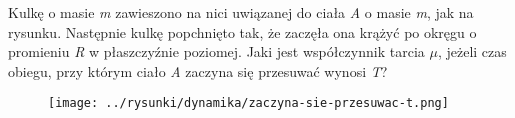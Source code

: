Kulkę o masie \emph{m} zawieszono na nici uwiązanej do ciała \emph{A} o masie \emph{m}, jak na rysunku. Następnie kulkę popchnięto tak, że zaczęła ona krążyć po okręgu o promieniu \emph{R} w płaszczyźnie poziomej. Jaki jest współczynnik tarcia \emph{$\mu$}, jeżeli czas obiegu, przy którym ciało \emph{A} zaczyna się przesuwać wynosi \emph{T}?

\begin{figure}[H]
	\centering
	\texttt{[image: ../rysunki/dynamika/zaczyna-sie-przesuwac-t.png]}
\end{figure}

